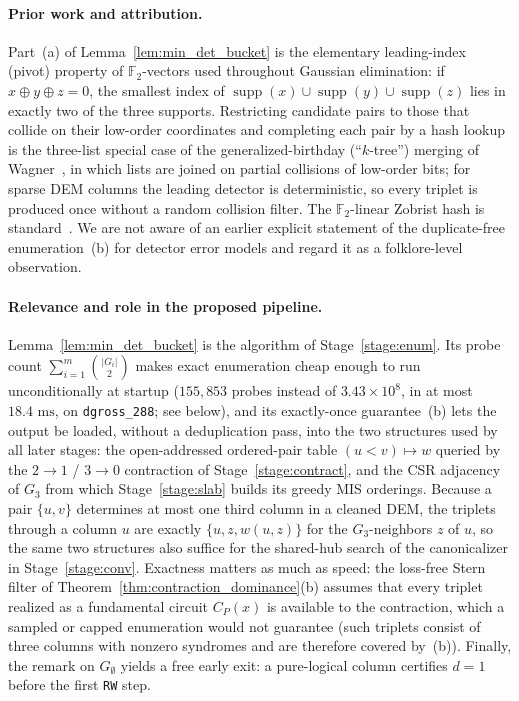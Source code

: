 \documentclass[12pt]{article}
\theoremstyle{definition}
\newcommand{\Ftwo}{\mathbb{F}_2}
\DeclareMathOperator{\supp}{supp}
\newcommand{\ttt}[1]{\texttt{#1}}
\begin{document}
\paragraph{Prior work and attribution.}
Part~(a) of Lemma~\ref{lem:min_det_bucket} is the elementary leading-index (pivot) property of $\Ftwo$-vectors used
throughout Gaussian elimination: if $x \oplus y \oplus z = 0$, the smallest index of $\supp(x) \cup \supp(y) \cup
\supp(z)$ lies in exactly two of the three supports. Restricting candidate pairs to those that collide on their
low-order coordinates and completing each pair by a hash lookup is the three-list special case of the
generalized-birthday (``$k$-tree'') merging of Wagner~\cite{Wagner2002}, in which lists are joined on partial
collisions of low-order bits; for sparse DEM columns the leading detector is deterministic, so every triplet is
produced once without a random collision filter. The $\Ftwo$-linear Zobrist hash is
standard~\cite{Zobrist1970,CarterWegman1979}. We are not aware of an earlier explicit statement of the
duplicate-free enumeration~(b) for detector error models and regard it as a folklore-level observation.

\paragraph{Relevance and role in the proposed pipeline.}
Lemma~\ref{lem:min_det_bucket} is the algorithm of Stage~\ref{stage:enum}. Its probe count $\sum_{i=1}^m
\binom{|G_i|}{2}$ makes exact enumeration cheap enough to run unconditionally at startup ($155{,}853$ probes instead
of $3.43 \times 10^8$, in at most $18.4\text{ ms}$, on \ttt{dgross\_288}; see below), and its exactly-once
guarantee~(b) lets the output be loaded, without a deduplication pass, into the two structures used by all later
stages: the open-addressed ordered-pair table $(u < v) \mapsto w$ queried by the $2 \to 1$ / $3 \to 0$ contraction of
Stage~\ref{stage:contract}, and the CSR adjacency of $G_3$ from which Stage~\ref{stage:slab} builds its greedy MIS
orderings. Because a pair $\{u, v\}$ determines at most one third column in a cleaned DEM, the triplets through a
column $u$ are exactly $\{u, z, w(u, z)\}$ for the $G_3$-neighbors $z$ of $u$, so the same two structures also suffice
for the shared-hub search of the canonicalizer in Stage~\ref{stage:conv}. Exactness matters as much as speed: the
loss-free Stern filter of Theorem~\ref{thm:contraction_dominance}(b) assumes that every triplet realized as a
fundamental circuit $C_P(x)$ is available to the contraction, which a sampled or capped enumeration would not
guarantee (such triplets consist of three columns with nonzero syndromes and are therefore covered by~(b)). Finally,
the remark on $G_\emptyset$ yields a free early exit: a pure-logical column certifies $d = 1$ before the first
\ttt{RW} step.
\end{document}
